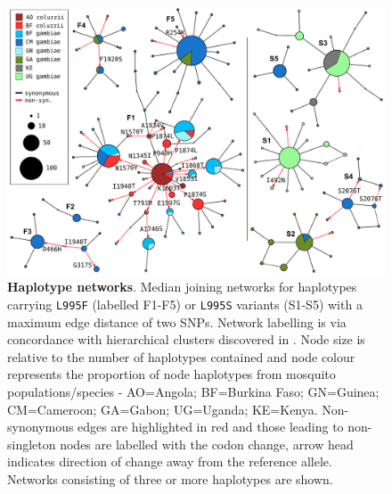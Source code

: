 \documentclass[a4paper,11pt,abstracton,hidelinks]{scrartcl}
\begin{document}
%
\begin{figure}[!t]
  \includegraphics[width=1.1\linewidth,center]{artwork/complete_networks.pdf}
  \caption{\textbf{Haplotype networks}. Median joining networks for haplotypes carrying \texttt{L995F} (labelled F1-F5) or \texttt{L995S} variants (S1-S5) with a maximum edge distance of two SNPs. Network labelling is via concordance with hierarchical clusters discovered in \cite{Ag1000gConsortium2017}. Node size is relative to the number of haplotypes contained and node colour represents the proportion of node haplotypes from mosquito populations/species - AO=Angola; BF=Burkina Faso; GN=Guinea; CM=Cameroon; GA=Gabon; UG=Uganda; KE=Kenya. Non-synonymous edges are highlighted in red and those leading to non-singleton nodes are labelled with the codon change, arrow head indicates direction of change away from the reference allele. Networks consisting of three or more haplotypes are shown.}
  \label{fig:networks}
\end{figure}
\end{document}
